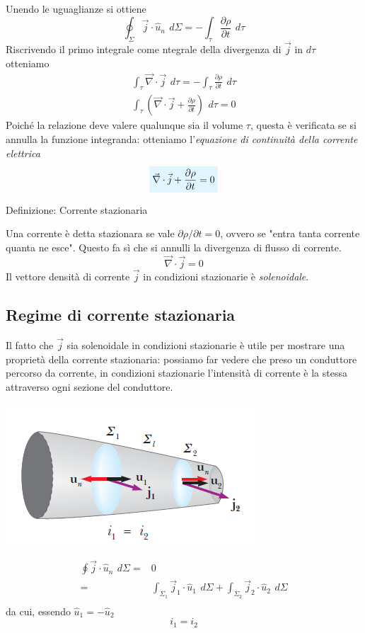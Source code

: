 \documentclass[x11names]{report}
\newcommand{\definizione}[2]{
	\begin{center}
		\fboxsep11pt
		\colorbox{myblue}{\begin{minipage}{5.75in}
				\begin{blues}{Definizione: #1}
					#2
				\end{blues}
		\end{minipage}}
	\end{center}
}
\newcommand{\viola}[1]{%
	\colorbox{myblue}{$\displaystyle #1$}
}
\begin{document}
Unendo le uguaglianze si ottiene
\[
\oint_{\Sigma} \vec{j}\cdot \hat{u}_n \,\ d\Sigma = -\int_\tau \frac{\partial\rho}{\partial t} \,\ d\tau
\]
Riscrivendo il primo integrale come ntegrale della divergenza di \(\vec{j}\) in \(d\tau\) otteniamo
\begin{gather}
	\int_\tau \vec{\nabla} \cdot \vec{j} \,\ d\tau = - \int_\tau \frac{\partial\rho}{\partial t} \,\ d\tau \\
	\int_\tau \left(\vec{\nabla} \cdot \vec{j} + \frac{\partial\rho}{\partial t}\right)\,\ d\tau = 0
\end{gather}
Poiché la relazione deve valere qualunque sia il volume \(\tau\), questa è verificata se si annulla la funzione integranda: otteniamo l'\textit{equazione di continuità della corrente elettrica}
\begin{equation}
	\label{cont corr}
	\viola{\vec{\nabla} \cdot \vec{j} + \frac{\partial\rho}{\partial t} = 0}
\end{equation}
\definizione{Corrente stazionaria}{
Una corrente è detta stazionara se vale \(\partial \rho/\partial t = 0\), ovvero se "entra tanta corrente quanta ne esce". Questo fa sì che si annulli la divergenza di flusso di corrente.
\begin{equation}
	\vec{\nabla} \cdot \vec{j} = 0
\end{equation}
Il vettore densità di corrente \(\vec{j}\) in condizioni stazionarie è \textit{solenoidale}.
}
\subsection{Regime di corrente stazionaria}
Il fatto che \(\vec{j}\) sia solenoidale in condizioni stazionarie è utile per mostrare una proprietà della corrente stazionaria: possiamo far vedere che preso un conduttore percorso da corrente, in condizioni stazionarie l'intensità di corrente è la stessa attraverso ogni sezione del conduttore.
\begin{center}
	\includegraphics[scale=0.5]{img/regime_corrente.png}
\end{center}
\begin{align*}
	\oint \vec{j}\cdot \hat{u}_n \,\ d\Sigma =& 0 \\
	=& \int_{\Sigma_1}\vec{j}_1\cdot \hat{u}_1 \,\ d\Sigma + \int_{\Sigma_2}\vec{j}_2\cdot \hat{u}_2 \,\ d\Sigma \\
\end{align*}
da cui, essendo \(\hat{u}_1 = - \hat{u}_2\)
\[
i_1 = i_2
\]
\end{document}

